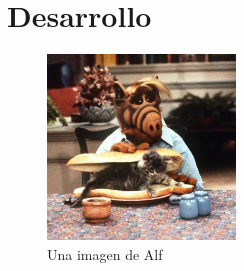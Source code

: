 \section{Desarrollo}

\begin{figure}[htb]
    \centering
    \includegraphics[width=5cm]{images/alf}
    \caption{Una imagen de Alf}
    \label{fig:figure}
\end{figure}
